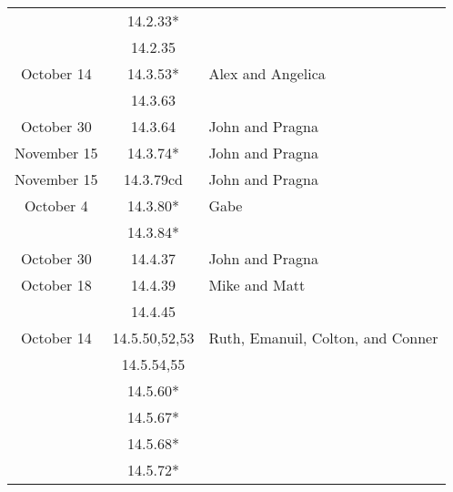 \documentclass[12pt]{amsart}
\begin{document}
\begin{longtable}{c|c|l}
                        & 14.2.33*                             &                                          \\
                        & 14.2.35                              &                                          \\
        October 14      & 14.3.53*                             & Alex and Angelica                        \\
                        & 14.3.63                              &                                          \\
        October 30      & 14.3.64                              & John and Pragna                          \\
        November 15     & 14.3.74*                             & John and Pragna                          \\
        November 15     & 14.3.79cd                            & John and Pragna                          \\
        October 4       & 14.3.80*                             & Gabe                                     \\
                        & 14.3.84*                             &                                          \\
        October 30      & 14.4.37                              & John and Pragna                          \\
        October 18      & 14.4.39                              & Mike and Matt                            \\
                        & 14.4.45                              &                                          \\
        October 14      & 14.5.50,52,53                        & Ruth, Emanuil, Colton, and Conner        \\
                        & 14.5.54,55                           &                                          \\
                        & 14.5.60*                             &                                          \\
                        & 14.5.67*                             &                                          \\
                        & 14.5.68*                             &                                          \\
                        & 14.5.72*                             &                                          \\

\end{longtable}
\end{document}
